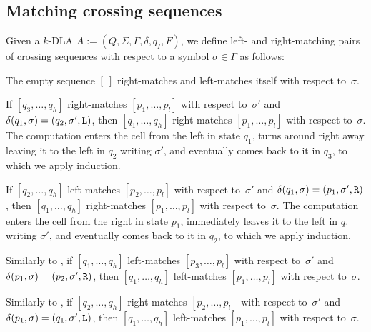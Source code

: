 \subsection{Matching crossing sequences}
\begin{defn}
	Given a $k$-DLA $A:=(Q,\Sigma,\Gamma,\delta,q_I,F)$, we define left- and right-matching pairs of crossing sequences with respect to a symbol $\sigma\in\Gamma$ as follows:
	\begin{rules}
		\item \label{itm:crossmatchswepDLA-1} The empty sequence $[~]$ right-matches and left-matches itself with respect to~$\sigma$.
		\item \label{itm:crossmatchswepDLA-2} If $[q_3,\dots,q_h]$ right-matches $[p_1,\dots,p_l]$ with respect to~$\sigma'$ and $\delta(q_1,\sigma)=(q_2,\sigma',\mathtt L)$, then $[q_1,\dots,q_h]$ right-matches $[p_1,\dots,p_l]$ with respect to~$\sigma$.
		The computation enters the cell from the left in state $q_1$, turns around right away leaving it to the left in $q_2$ writing $\sigma'$, and eventually comes back to it in $q_3$, to which we apply induction.
		\item \label{itm:crossmatchswepDLA-3} If $[q_2,\dots,q_h]$ left-matches $[p_2,\dots,p_l]$ with respect to~$\sigma'$ and $\delta(q_1,\sigma)=(p_1,\sigma',\mathtt R)$, then $[q_1,\dots,q_h]$ right-matches $[p_1,\dots,p_l]$ with respect to~$\sigma$.
		The computation enters the cell from the right in state $p_1$, immediately leaves it to the left in $q_1$ writing $\sigma'$, and eventually comes back to it in $q_2$, to which we apply induction.
		\item \label{itm:crossmatchswepDLA-4} Similarly to , if $[q_1,\dots,q_h]$ left-matches $[p_3,\dots,p_l]$ with respect to~$\sigma'$ and $\delta(p_1,\sigma)=(p_2,\sigma',\mathtt R)$, then $[q_1,\dots,q_h]$ left-matches $[p_1,\dots,p_l]$ with respect to~$\sigma$.
		\item \label{itm:crossmatchswepDLA-5} Similarly to , if $[q_2,\dots,q_h]$ right-matches $[p_2,\dots,p_l]$ with respect to~$\sigma'$ and $\delta(p_1,\sigma)=(q_1,\sigma',\mathtt L)$, then $[q_1,\dots,q_h]$ left-matches $[p_1,\dots,p_l]$ with respect to~$\sigma$.
	\end{rules}
\end{defn}

